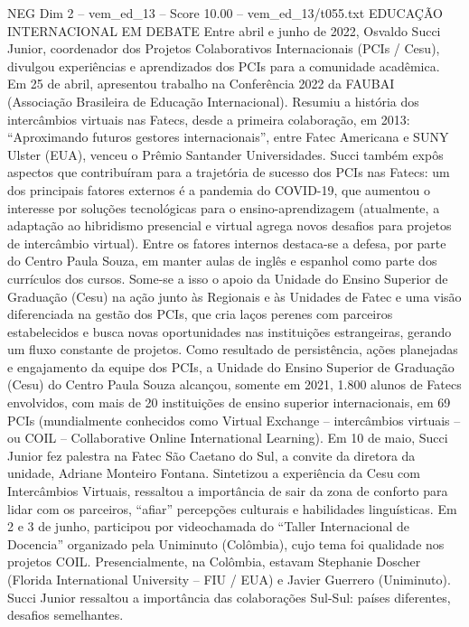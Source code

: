 \begin{textsample}{NEG Dim 2 – vem\_ed\_13 – Score 10.00 – vem\_ed\_13/t055.txt}  \label{ex:f2_neg_113}
EDUCAÇÃO INTERNACIONAL EM DEBATE Entre abril e junho de 2022, Osvaldo Succi Junior, coordenador dos Projetos Colaborativos Internacionais (PCIs / Cesu), divulgou experiências e aprendizados dos PCIs para a comunidade acadêmica.
Em 25 de abril, apresentou trabalho na Conferência 2022 da FAUBAI (Associação Brasileira de Educação Internacional).
Resumiu a história dos intercâmbios virtuais nas Fatecs, desde a primeira colaboração, em 2013: “Aproximando futuros gestores internacionais”, entre Fatec Americana e SUNY Ulster (EUA), venceu o Prêmio Santander Universidades.
Succi também expôs aspectos que contribuíram para a trajetória de sucesso dos PCIs nas Fatecs: um dos principais fatores externos é a pandemia do COVID-19, que aumentou o interesse por soluções tecnológicas para o ensino-aprendizagem (atualmente, a adaptação ao hibridismo presencial e virtual agrega novos desafios para projetos de intercâmbio virtual).
Entre os fatores internos destaca-se a defesa, por parte do Centro Paula Souza, em manter aulas de inglês e espanhol como parte dos currículos dos cursos.
Some-se a isso o apoio da Unidade do Ensino Superior de Graduação (Cesu) na ação junto às Regionais e às Unidades de Fatec e uma visão diferenciada na gestão dos PCIs, que cria laços perenes com parceiros estabelecidos e busca novas oportunidades nas instituições estrangeiras, gerando um fluxo constante de projetos.
Como resultado de persistência, ações planejadas e engajamento da equipe dos PCIs, a Unidade do Ensino Superior de Graduação (Cesu) do Centro Paula Souza alcançou, somente em 2021, 1.800 alunos de Fatecs envolvidos, com mais de 20 instituições de ensino superior internacionais, em 69 PCIs (mundialmente conhecidos como Virtual Exchange – intercâmbios virtuais – ou COIL – Collaborative Online International Learning).
Em 10 de maio, Succi Junior fez palestra na Fatec São Caetano do Sul, a convite da diretora da unidade, Adriane Monteiro Fontana.
Sintetizou a experiência da Cesu com Intercâmbios Virtuais, ressaltou a importância de sair da zona de conforto para lidar com os parceiros, “afiar” percepções culturais e habilidades linguísticas.
Em 2 e 3 de junho, participou por videochamada do “Taller Internacional de Docencia” organizado pela Uniminuto (Colômbia), cujo tema foi qualidade nos projetos COIL.
Presencialmente, na Colômbia, estavam Stephanie Doscher (Florida International University – FIU / EUA) e Javier Guerrero (Uniminuto).
Succi Junior ressaltou a importância das colaborações Sul-Sul: países diferentes, desafios semelhantes.

\end{textsample}
